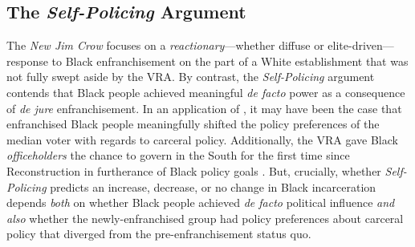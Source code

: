 \documentclass[12pt]{article}
\begin{document}
\subsection*{The \emph{Self-Policing} Argument}

The \emph{New Jim Crow} focuses on a \emph{reactionary}---whether diffuse or elite-driven---response to Black enfranchisement on the part of a White establishment that was not fully swept aside by the VRA.  By contrast, the \emph{Self-Policing} argument contends that Black people achieved meaningful \emph{de facto} power as a consequence of \emph{de jure} enfranchisement.  In an application of \citep{Downs:1957vg}, it may have been the case that enfranchised Black people meaningfully shifted the policy preferences of the median voter with regards to carceral policy.  Additionally, the VRA gave Black \emph{officeholders} the chance to govern in the South for the first time since Reconstruction in furtherance of Black policy goals \citep{Beach:2017wo}.  But, crucially, whether \emph{Self-Policing} predicts an increase, decrease, or no change in Black incarceration depends \emph{both} on whether Black people achieved \emph{de facto} political influence \emph{and also} whether the newly-enfranchised group had policy preferences about carceral policy that diverged from the pre-enfranchisement status quo.
\end{document}
